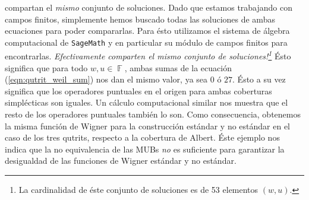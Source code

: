 \documentclass[a4paper]{report}
\DeclareMathOperator{\F}{\mathbb{F}}
\begin{document}
  compartan el \textit{mismo} conjunto de soluciones. Dado
  que estamos trabajando con campos finitos, simplemente
  hemos buscado todas las soluciones de ambas ecuaciones
  para poder compararlas. Para ésto utilizamos el sistema de
  álgebra computacional de \texttt{SageMath} y en particular
  su módulo de campos finitos para encontrarlas.
  \textit{Efectivamente comparten el mismo conjunto de
  soluciones!\footnote{La cardinalidad de éste conjunto de
  soluciones es de 53 elementos $(w,u)$.}} Ésto significa
  que para todo $w, u \in \F$, ambas sumas de la ecuación
  (\ref{eqn:qutrit_weil_sum}) nos dan el mismo valor, ya sea
  $0$ ó $27$. Ésto a su vez significa que los operadores
  puntuales en el origen para ambas coberturas simplécticas
  son iguales. Un cálculo computacional similar nos muestra
  que el resto de los operadores puntuales también lo son.
  Como consecuencia, obtenemos la misma función de Wigner
  para la construcción estándar y no estándar en el caso de
  los tres qutrits, respecto a la cobertura de Albert. Éste
  ejemplo nos indica que la no equivalencia de las MUBs
  \textit{no} es suficiente para garantizar la desigualdad
  de las funciones de Wigner estándar y no estándar.
\end{document}
